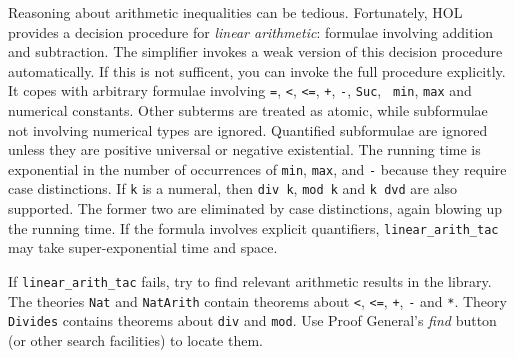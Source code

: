 Reasoning about arithmetic inequalities can be tedious.  Fortunately, HOL
provides a decision procedure for \emph{linear arithmetic}: formulae involving
addition and subtraction. The simplifier invokes a weak version of this
decision procedure automatically. If this is not sufficent, you can invoke the
full procedure  explicitly.  It copes with arbitrary
formulae involving {\tt=}, {\tt<}, {\tt<=}, {\tt+}, {\tt-}, {\tt Suc}, {\tt
  min}, {\tt max} and numerical constants. Other subterms are treated as
atomic, while subformulae not involving numerical types are ignored. Quantified
subformulae are ignored unless they are positive universal or negative
existential. The running time is exponential in the number of
occurrences of {\tt min}, {\tt max}, and {\tt-} because they require case
distinctions.
If {\tt k} is a numeral, then {\tt div k}, {\tt mod k} and
{\tt k dvd} are also supported. The former two are eliminated
by case distinctions, again blowing up the running time.
If the formula involves explicit quantifiers, \texttt{linear_arith_tac} may take
super-exponential time and space.

If \texttt{linear_arith_tac} fails, try to find relevant arithmetic results in
the library.  The theories \texttt{Nat} and \texttt{NatArith} contain
theorems about {\tt<}, {\tt<=}, \texttt{+}, \texttt{-} and \texttt{*}.
Theory \texttt{Divides} contains theorems about \texttt{div} and
\texttt{mod}.  Use Proof General's \emph{find} button (or other search
facilities) to locate them.



